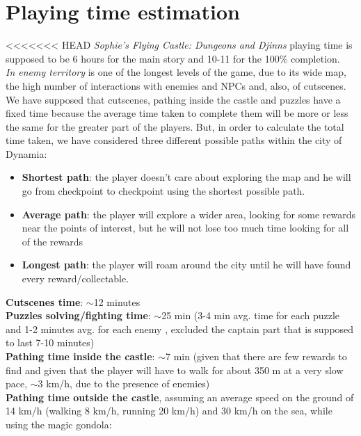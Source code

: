 \section{Playing time estimation}
<<<<<<< HEAD
\textit{Sophie's Flying Castle: Dungeons and Djinns} playing time is supposed to be 6 hours for the main story and 10-11 for the 100\% completion.\\
\textit{In enemy territory} is one of the longest levels of the game, due to its wide map, the high number of interactions with enemies and NPCs and, also, of cutscenes.
We have supposed that cutscenes, pathing inside the castle and puzzles have a fixed time because the average time taken to complete them will be more or less the same for the greater part of the players. But, in order to calculate the total time taken, we have considered three different possible paths within the city of Dynamia:
\begin{itemize}
\item \textbf{Shortest path}: the player doesn't care about exploring the map and he will go from checkpoint to checkpoint using the shortest possible path.
\item \textbf{Average path}: the player will explore a wider area, looking for some rewards near the points of interest, but he will not lose too much time looking for all of the rewards
\item \textbf{Longest path}: the player will roam around the city until he will have found every reward/collectable.
\end{itemize}
\textbf{Cutscenes time}: $\sim$12 minutes\\
\textbf{Puzzles solving/fighting time}: $\sim$25 min (3-4 min avg. time for each puzzle and 1-2 minutes avg. for each enemy , excluded the captain part that is supposed to last 7-10 minutes)\\
\textbf{Pathing time inside the castle}: $\sim$7 min (given that there are few rewards to find and given that the player will have to walk for about 350 m at a very slow pace, $\sim$3 km/h, due to the presence of enemies)\\
\textbf{Pathing time outside the castle}, assuming an average speed on the ground of 14 km/h (walking 8 km/h, running 20 km/h) and 30 km/h on the sea, while using the magic gondola:\\
